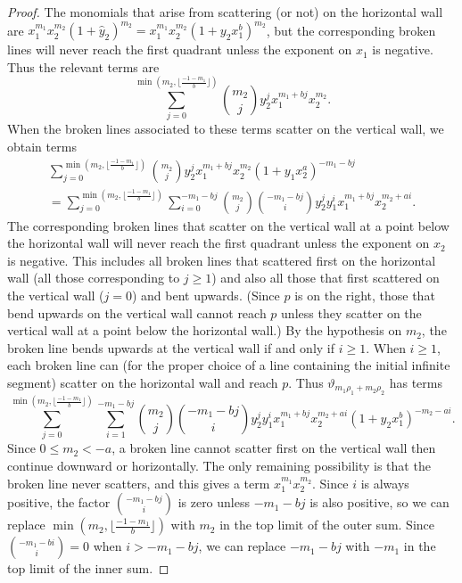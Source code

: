 \documentclass[ALCO,ThmDefs,Unicode,epreuves]{cedram}
\newcommand{\thet}{\vartheta}
\newcommand{\hy}{\hat{y}}
\begin{document}
\begin{proof}
The monomials that arise from scattering (or not) on the horizontal wall are $x_1^{m_1}x_2^{m_2}(1+\hy_2)^{m_2}=x_1^{m_1}x_2^{m_2}(1+y_2x_1^b)^{m_2}$, but the corresponding broken lines will never reach the first quadrant unless the exponent on $x_1$ is negative.
Thus the relevant terms are 
\[\sum_{j=0}^{\min(m_2,\lfloor\frac{-1-m_1}{b}\rfloor)}\binom{m_2}jy_2^jx_1^{m_1+bj}x_2^{m_2}.\]
When the broken lines associated to these terms scatter on the vertical wall, we obtain terms
\begin{multline*}
\sum_{j=0}^{\min(m_2,\lfloor\frac{-1-m_1}{b}\rfloor)}\binom{m_2}jy_2^jx_1^{m_1+bj}x_2^{m_2}(1+y_1x_2^a)^{-m_1-bj}\\
=\sum_{j=0}^{\min(m_2,\lfloor\frac{-1-m_1}{b}\rfloor)}\sum_{i=0}^{-m_1-bj}\binom{m_2}j\binom{-m_1-bj}i y_2^jy_1^ix_1^{m_1+bj}x_2^{m_2+ai}.
\end{multline*}
The corresponding broken lines that scatter on the vertical wall at a point below the horizontal wall will never reach the first quadrant unless the exponent on $x_2$ is negative.
This includes all broken lines that scattered first on the horizontal wall (\ie all those corresponding to $j\ge1$) and also all those that first scattered on the vertical wall (\ie $j=0$) and bent upwards.
(Since $p$ is on the right, those that bend upwards on the vertical wall cannot reach $p$ unless they scatter on the vertical wall at a point below the horizontal wall.)
By the hypothesis on $m_2$, the broken line bends upwards at the vertical wall if and only if $i\ge1$.
When $i\ge1$, each broken line can (for the proper choice of a line containing the initial infinite segment) scatter on the horizontal wall and reach $p$.
Thus $\thet_{m_1\rho_1+m_2\rho_2}$ has terms
\[\sum_{j=0}^{\min(m_2,\lfloor\frac{-1-m_1}{b}\rfloor)}\sum_{i=1}^{-m_1-bj}\binom{m_2}j\binom{-m_1-bj}i y_2^jy_1^ix_1^{m_1+bj}x_2^{m_2+ai}(1+y_2x_1^b)^{-m_2-ai}.\]
Since $0\le m_2<-a$, a broken line cannot scatter first on the vertical wall then continue downward or horizontally.
The only remaining possibility is that the broken line never scatters, and this gives a term $x_1^{m_1}x_2^{m_2}$.
Since $i$ is always positive, the factor $\binom{-m_1-bj}i$ is zero unless $-m_1-bj$ is also positive, so we can replace $\min(m_2,\lfloor\frac{-1-m_1}{b}\rfloor)$ with $m_2$ in the top limit of the outer sum.
Since $\binom{-m_1-bi}i=0$ when $i>-m_1-bj$, we can replace $-m_1-bj$ with $-m_1$ in the top limit of the inner sum.
\end{proof}
\end{document}
